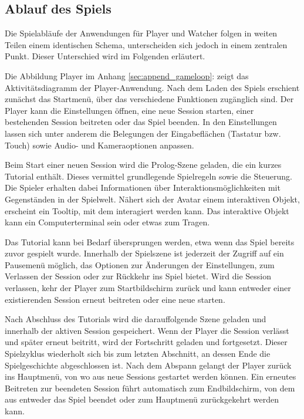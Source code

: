 \subsection{Ablauf des Spiels}

Die Spielabläufe der Anwendungen für Player und Watcher folgen in weiten Teilen einem identischen Schema, unterscheiden sich jedoch in einem zentralen Punkt. Dieser Unterschied wird im Folgenden erläutert.

Die Abbildung Player im Anhang \ref{sec:append_gameloop}:  zeigt das Aktivitätsdiagramm der Player-Anwendung. Nach dem Laden des Spiels erschient zunächst das Startmenü, über das verschiedene Funktionen zugänglich sind. Der Player kann die Einstellungen öffnen, eine neue Session starten, einer bestehenden Session beitreten oder das Spiel beenden. In den Einstellungen lassen sich unter anderem die Belegungen der Eingabeflächen (Tastatur bzw. Touch) sowie Audio- und Kameraoptionen anpassen.

Beim Start einer neuen Session wird die Prolog-Szene geladen, die ein kurzes Tutorial enthält. Dieses vermittel grundlegende Spielregeln sowie die Steuerung. Die Spieler erhalten dabei Informationen über Interaktionsmöglichkeiten mit Gegenständen in der Spielwelt. Nähert sich der Avatar einem interaktiven Objekt, erscheint ein Tooltip, mit dem interagiert werden kann. Das interaktive Objekt kann ein Computerterminal sein oder etwas zum Tragen.

Das Tutorial kann bei Bedarf übersprungen werden, etwa wenn das Spiel bereits zuvor gespielt wurde. Innerhalb der Spielszene ist jederzeit der Zugriff auf ein Pausemenü möglich, das Optionen zur Änderungen der Einstellungen, zum Verlassen der Session oder zur Rückkehr ins Spiel bietet. Wird die Session verlassen, kehr der Player zum Startbildschirm zurück und kann entweder einer existierenden Session erneut beitreten oder eine neue starten.

Nach Abschluss des Tutorials wird die darauffolgende Szene geladen und innerhalb der aktiven Session gespeichert. Wenn der Player die Session verlässt und später erneut beitritt, wird der Fortschritt geladen und fortgesetzt. Dieser Spielzyklus wiederholt sich bis zum letzten Abschnitt, an dessen Ende die Spielgeschichte abgeschlossen ist. Nach dem Abspann gelangt der Player zurück ins Hauptmenü, von wo aus neue Sessions gestartet werden können. Ein erneutes Beitreten zur beendeten Session führt automatisch zum Endbildschirm, von dem aus entweder das Spiel beendet oder zum Hauptmenü zurückgekehrt werden kann.

